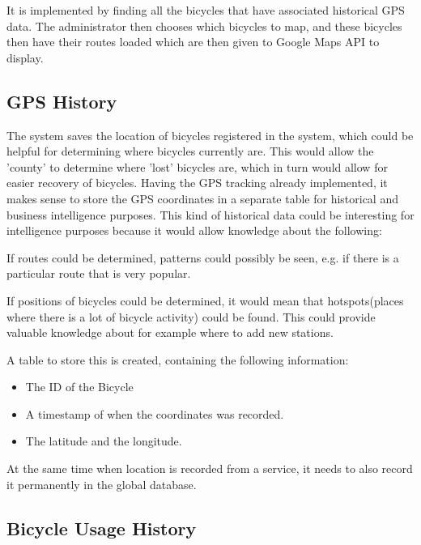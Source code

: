 It is implemented by finding all the bicycles that have associated historical GPS data.
 The administrator then chooses which bicycles to map, and these bicycles then have their routes loaded which are then given to Google Maps API to display.


\subsection{GPS History}\label{sec:gpsHistory}
The system saves the location of bicycles registered in the system, which could be helpful for determining where bicycles currently are. 
This would allow the 'county' to determine where 'lost' bicycles are, which in turn would allow for easier recovery of bicycles.
Having the GPS tracking already implemented, it makes sense to store the GPS coordinates in a separate table for historical and business intelligence purposes.
This kind of historical data could be interesting for intelligence purposes because it would allow knowledge about the following:

\begin{description}[style=nextline]
\item[Which routes are used?] If routes could be determined, patterns could possibly be seen, e.g. if there is a particular route that is very popular.
\item[Are there hotspots for bicycles?] If positions of bicycles could be determined, it would mean that hotspots(places where there is a lot of bicycle activity) could be found. 
This could provide valuable knowledge about for example where to add new stations.
\end{description}

A table to store this is created, containing the following information:

\begin{itemize}
\item The ID of the Bicycle
\item A timestamp of when the coordinates was recorded.
\item The latitude and the longitude.
\end{itemize}

At the same time when location is recorded from a service, it needs to also record it permanently in the global database.

\subsection{Bicycle Usage History}\label{sec:bicycleUsageHistory}

